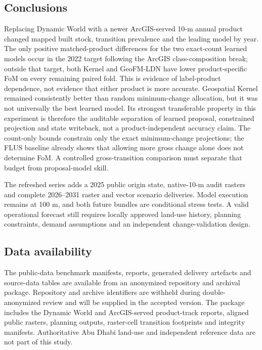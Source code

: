 \subsection{Conclusions}\label{conclusions}

Replacing Dynamic World with a newer ArcGIS-served 10-m annual product
changed mapped built stock, transition prevalence and the leading model
by year. The only positive matched-product differences for the two
exact-count learned models occur in the 2022 target following the ArcGIS
class-composition break; outside that target, both Kernel and GeoFM-LDN
have lower product-specific FoM on every remaining paired fold. This is
evidence of label-product dependence, not evidence that either product
is more accurate. Geospatial Kernel remained consistently better than
random minimum-change allocation, but it was not universally the best
learned model. Its strongest transferable property in this experiment is
therefore the auditable separation of learned proposal, constrained
projection and state writeback, not a product-independent accuracy
claim. The count-only bounds constrain only the exact minimum-change
projections; the FLUS baseline already shows that allowing more gross
change alone does not determine FoM. A controlled gross-transition
comparison must separate that budget from proposal-model skill.

The refreshed series adds a 2025 public origin state, native-10-m audit
rasters and complete 2026--2031 raster and vector scenario deliveries.
Model execution remains at 100 m, and both future bundles are
conditional stress tests. A valid operational forecast still requires
locally approved land-use history, planning constraints, demand
assumptions and an independent change-validation design.

\subsection{Data availability}\label{data-availability}

The public-data benchmark manifests, reports, generated delivery
artefacts and source-data tables are available from an anonymized
repository and archival package. Repository and archive identifiers are
withheld during double-anonymized review and will be supplied in the
accepted version. The package includes the Dynamic World and
ArcGIS-served product-track reports, aligned public rasters, planning
outputs, raster-cell transition footprints and integrity manifests.
Authoritative Abu Dhabi land-use and independent reference data are not
part of this study.

